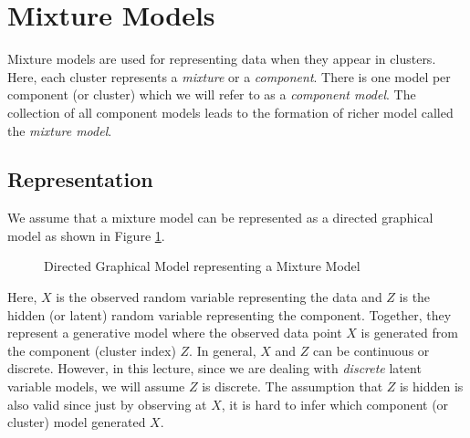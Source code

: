 \documentclass[twoside,11pt,a4paper]{book}
\begin{document}

\section{Mixture Models}
Mixture models are used for representing data when they appear in clusters. Here, each cluster represents a \textit{mixture} or a \textit{component}. There is one model per component (or cluster) which we will refer to as a \textit{component model}. The collection of all component models leads to the formation of richer model called the \textit{mixture model}.

\subsection{Representation}
We assume that a mixture model can be represented as a directed graphical model as shown in Figure \ref{fig:DAG-MM}.
\begin{figure}[ht]
\centering
{}
\caption{Directed Graphical Model representing a Mixture Model}
\label{fig:DAG-MM}
\end{figure}


Here, $X$ is the observed random variable representing the data and $Z$ is the hidden (or latent) random variable representing the component. Together, they represent a generative model where the observed data point $X$ is generated from the component (cluster index) $Z$. In general, $X$ and $Z$  can be continuous or  discrete. However, in this lecture, since we are dealing with \textit{discrete} latent variable models, we will assume $Z$ is discrete. The assumption that $Z$ is hidden is also valid since just by observing at $X$, it is hard to infer which component (or cluster) model generated $X$.
\end{document}
